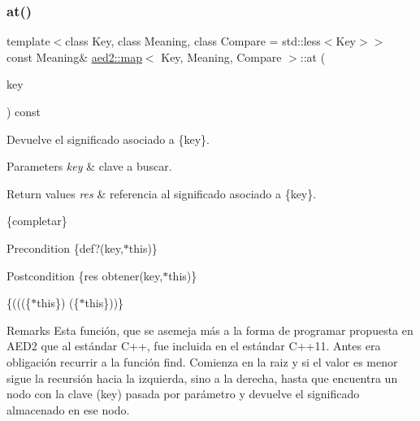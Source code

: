 \subsubsection{\texorpdfstring{at()}{at()}\hspace{0.1cm}{\footnotesize\ttfamily [2/4]}}
{\footnotesize\ttfamily template$<$class Key, class Meaning, class Compare = std\+::less$<$\+Key$>$$>$ \\
const Meaning\& \hyperlink{classaed2_1_1map}{aed2\+::map}$<$ Key, Meaning, Compare $>$\+::at (\begin{DoxyParamCaption}\item[{const Key \&}]{key }\end{DoxyParamCaption}) const\hspace{0.3cm}{\ttfamily [inline]}}



Devuelve el significado asociado a \{key\}. 


\begin{DoxyParams}{Parameters}
{\em key} & clave a buscar. \\
\hline
\end{DoxyParams}

\begin{DoxyRetVals}{Return values}
{\em res} & referencia al significado asociado a \{key\}.\\
\hline
\end{DoxyRetVals}
\{completar\}

\begin{DoxyPrecond}{Precondition}
\{def?(key,$\ast$this)\}
\end{DoxyPrecond}
\begin{DoxyPostcond}{Postcondition}
\{res  obtener(key,$\ast$this)\}
\end{DoxyPostcond}
\{(((\{$\ast$this\})  (\{$\ast$this\}))\}

\begin{DoxyRemark}{Remarks}
Esta función, que se asemeja más a la forma de programar propuesta en A\+E\+D2 que al estándar C++, fue incluida en el estándar C++11. Antes era obligación recurrir a la función find. Comienza en la raiz y si el valor es menor sigue la recursión hacia la izquierda, sino a la derecha, hasta que encuentra un nodo con la clave (key) pasada por parámetro y devuelve el significado almacenado en ese nodo. 
\end{DoxyRemark}
\mbox{\label{classaed2_1_1map_a6b21c09f59a83b6ee45432dcfa61f4a1}} 
